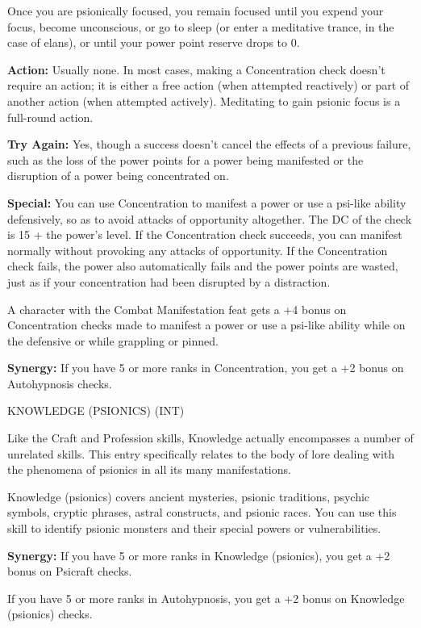 \documentclass{article}
\begin{document}
Once you are psionically focused, you remain focused until you expend your focus, 
become unconscious, or go to sleep (or enter a meditative trance, in the case of 
elans), or until your power point reserve drops to 0.

\textbf{Action:} Usually none. In most cases, making a Concentration check doesn't 
require an action; it is either a free action (when attempted reactively) or part 
of another action (when attempted actively). Meditating to gain psionic focus is 
a full-round action.

\textbf{Try Again:} Yes, though a success doesn't cancel the effects of a previous 
failure, such as the loss of the power points for a power being manifested or the 
disruption of a power being concentrated on.

\textbf{Special:} You can use Concentration to manifest a power or use a psi-like 
ability defensively, so as to avoid attacks of opportunity altogether. The DC of 
the check is 15 + the power's level. If the Concentration check succeeds, you can 
manifest normally without provoking any attacks of opportunity. If the Concentration 
check fails, the power also automatically fails and the power points are wasted, 
just as if your concentration had been disrupted by a distraction.

A character with the Combat Manifestation feat gets a +4 bonus on Concentration 
checks made to manifest a power or use a psi-like ability while on the defensive 
or while grappling or pinned.

\textbf{Synergy:} If you have 5 or more ranks in Concentration, you get a +2 bonus 
on Autohypnosis checks.

\vspace{12pt}
KNOWLEDGE (PSIONICS){\large{} }(INT)

Like the Craft and Profession skills, Knowledge actually encompasses a number of 
unrelated skills. This entry specifically relates to the body of lore dealing with 
the phenomena of psionics in all its many manifestations.

Knowledge (psionics) covers ancient mysteries, psionic traditions, psychic symbols, 
cryptic phrases, astral constructs, and psionic races. You can use this skill to 
identify psionic monsters and their special powers or vulnerabilities.

\textbf{Synergy:} If you have 5 or more ranks in Knowledge (psionics), you get 
a +2 bonus on Psicraft checks.

If you have 5 or more ranks in Autohypnosis, you get a +2 bonus on Knowledge (psionics) 
checks.
\end{document}
